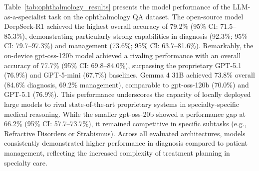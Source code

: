 \documentclass[10pt,journal,compsoc, onecolumn]{IEEEtran}
\begin{document}
Table~\ref{tab:ophthalmology_results} presents the model performance of the LLM-as-a-specialist task on the ophthalmology QA dataset. The open-source model DeepSeek-R1 achieved the highest overall accuracy of 79.2\% (95\% CI: 71.5--85.3\%), demonstrating particularly strong capabilities in diagnosis (92.3\%; 95\% CI: 79.7--97.3\%) and management (73.6\%; 95\% CI: 63.7--81.6\%). Remarkably, the on-device gpt-oss-120b model achieved a rivaling performance with an overall accuracy of 77.7\% (95\% CI: 69.8--84.0\%), surpassing the proprietary GPT-5.1 (76.9\%) and GPT-5-mini (67.7\%) baselines. Gemma 4 31B achieved 73.8\% overall (84.6\% diagnosis, 69.2\% management), comparable to gpt-oss-120b (70.0\%) and GPT-5.1 (76.9\%). This performance underscores the capacity of locally deployed large models to rival state-of-the-art proprietary systems in specialty-specific medical reasoning. While the smaller gpt-oss-20b showed a performance gap at 66.2\% (95\% CI: 57.7--73.7\%), it remained competitive in specific subtasks (e.g., Refractive Disorders or Strabismus). Across all evaluated architectures, models consistently demonstrated higher performance in diagnosis compared to patient management, reflecting the increased complexity of treatment planning in specialty care.
\end{document}
